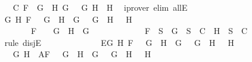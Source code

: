 \begin{isabellebody}
\ \ \ \ \ \ \ \ \ \ \ \ \isamarkupfalse%
\ C{}\ {\isacartoucheopen}F\ {\isacharequal}\ {\isacharparenleft}G{}\ \isactrlbold {\isasymrightarrow}\ H{}{\isacharparenright}{\isacartoucheclose}\ {\isacartoucheopen}G\ {\isacharequal}\ \isactrlbold {\isasymnot}\ G{}{\isacartoucheclose}\ {\isacartoucheopen}H\ {\isacharequal}\ H{}{\isacartoucheclose}\ \isamarkupfalse%
\ {\isacharparenleft}iprover\ elim{\isacharcolon}\ allE{\isacharparenright}\isanewline
\ \ \ \ \ \ \ \ \isamarkupfalse%
\isanewline
\ \ \ \ \ \ \ \ \ \ \isamarkupfalse%
\ {\isachardoublequoteopen}{\isacharparenleft}{\isasymexists}G{}\ H{}{\isachardot}\ F\ {\isacharequal}\ \isactrlbold {\isasymnot}\ {\isacharparenleft}G{}\ \isactrlbold {\isasymand}\ H{}{\isacharparenright}\ {\isasymand}\ G\ {\isacharequal}\ \isactrlbold {\isasymnot}\ G{}\ {\isasymand}\ H\ {\isacharequal}\ \isactrlbold {\isasymnot}\ H{}{\isacharparenright}\ {\isasymor}\ \isanewline
\ \ \ \ \ \ \ \ \ \ \ \ \ \ \ \ \ \ F\ {\isacharequal}\ \isactrlbold {\isasymnot}\ {\isacharparenleft}\isactrlbold {\isasymnot}\ G{\isacharparenright}\ {\isasymand}\ H\ {\isacharequal}\ G{\isachardoublequoteclose}\ \isanewline
\ \ \ \ \ \ \ \ \ \ \isamarkupfalse%
\ {\isachardoublequoteopen}F\ {\isasymin}\ S\ {\isasymlongrightarrow}\ {\isacharbraceleft}G{\isacharbraceright}\ {\isasymunion}\ S\ {\isasymin}\ C\ {\isasymor}\ {\isacharbraceleft}H{\isacharbraceright}\ {\isasymunion}\ S\ {\isasymin}\ C{\isachardoublequoteclose}\isanewline
\ \ \ \ \ \ \ \ \ \ \isamarkupfalse%
\ {\isacharparenleft}rule\ disjE{\isacharparenright}\isanewline
\ \ \ \ \ \ \ \ \ \ \ \ \isamarkupfalse%
\ E{}{\isacharcolon}{\isachardoublequoteopen}{\isasymexists}G{}\ H{}{\isachardot}\ F\ {\isacharequal}\ \isactrlbold {\isasymnot}\ {\isacharparenleft}G{}\ \isactrlbold {\isasymand}\ H{}{\isacharparenright}\ {\isasymand}\ G\ {\isacharequal}\ \isactrlbold {\isasymnot}\ G{}\ {\isasymand}\ H\ {\isacharequal}\ \isactrlbold {\isasymnot}\ H{}{\isachardoublequoteclose}\isanewline
\ \ \ \ \ \ \ \ \ \ \ \ \isamarkupfalse%
\ G{}\ H{}\ \ A{}{\isacharcolon}{\isachardoublequoteopen}F\ {\isacharequal}\ \isactrlbold {\isasymnot}\ {\isacharparenleft}G{}\ \isactrlbold {\isasymand}\ H{}{\isacharparenright}\ {\isasymand}\ G\ {\isacharequal}\ \isactrlbold {\isasymnot}\ G{}\ {\isasymand}\ H\ {\isacharequal}\ \isactrlbold {\isasymnot}\ H{}{\isachardoublequoteclose}\isanewline

\end{isabellebody}
